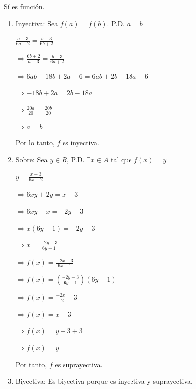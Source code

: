 \documentclass{article}
\begin{document}
\begin{enumerate}
\begin{enumerate}
        Sí es función.
        \vspace{\baselineskip}
        
        \begin{enumerate}
            \item[i)] Inyectiva: Sea \(f(a) = f(b)\). P.D. \(a = b\)
            
            \(\frac{a - 3}{6a + 2} = \frac{b - 3}{6b + 2}\)
            
            \(\Rightarrow \frac{6b + 2}{a - 3} = \frac{b - 3}{6a + 2}\)
            
            \(\Rightarrow 6ab - 18b + 2a - 6 = 6ab + 2b - 18a - 6\)
            
            \(\Rightarrow -18b + 2a = 2b - 18a\)
            
            \(\Rightarrow \frac{20a}{20} = \frac{20b}{20}\)
            
            \(\Rightarrow a = b\)
            
            Por lo tanto, \(f\) es inyectiva.

            \item[ii)] Sobre: Sea \(y \in B\), P.D. \(\exists x \in A\) tal que \(f(x) = y\)
            
            \(y = \frac{x + 3}{6x + 2}\)
            
            \(\Rightarrow 6xy + 2y = x - 3\)
            
            \(\Rightarrow 6xy - x = -2y - 3\)
            
            \(\Rightarrow x(6y - 1) = -2y - 3\)
            
            \(\Rightarrow x = \frac{-2y - 3}{6y - 1}\)
            
            \(\Rightarrow f(x) = \frac{-2x - 3}{6x - 1}\)
            
            \(\Rightarrow f(x) = \left(\frac{-2y - 3}{6y - 1}\right)(6y - 1)\)
            
            \(\Rightarrow f(x) = \frac{-2x}{-2} - 3\)
            
            \(\Rightarrow f(x) = x - 3\)
            
            \(\Rightarrow f(x) = y - 3 + 3\)
            
            \(\Rightarrow f(x) = y\)

            Por tanto, \(f\) es suprayectiva.
            
            \item[iii)] Biyectiva: Es biyectiva porque es inyectiva y suprayectiva.


\end{enumerate}
\end{enumerate}
\end{enumerate}
\end{document}

